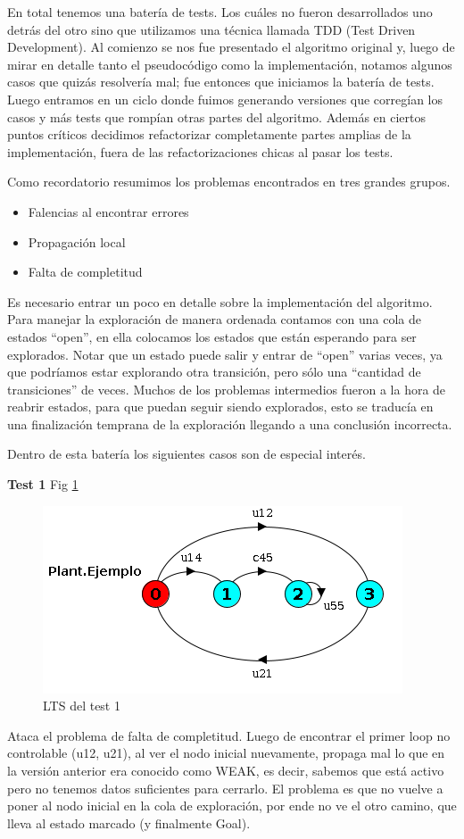En total tenemos una batería de \totalTests tests. Los cuáles no fueron desarrollados uno detrás del otro sino que utilizamos una técnica llamada TDD (Test Driven Development). Al comienzo se nos fue presentado el algoritmo original y, luego de mirar en detalle tanto el pseudocódigo como la implementación, notamos algunos casos que quizás resolvería mal; fue entonces que iniciamos la batería de tests. 
Luego entramos en un ciclo donde fuimos generando versiones que corregían los casos y más tests que rompían otras partes del algoritmo. Además en ciertos puntos críticos decidimos refactorizar completamente partes amplias de la implementación, fuera de las refactorizaciones chicas al pasar los tests.

Como recordatorio resumimos los problemas encontrados en tres grandes grupos.
\begin{itemize}
 \item Falencias al encontrar errores
 \item Propagación local
 \item Falta de completitud
\end{itemize}

Es necesario entrar un poco en detalle sobre la implementación del algoritmo. Para manejar la exploración de manera ordenada contamos con una cola de estados ``open'', en ella colocamos los estados que están esperando para ser explorados. Notar que un estado puede salir y entrar de ``open'' varias veces, ya que podríamos estar explorando otra transición, pero sólo una ``cantidad de transiciones'' de veces. Muchos de los problemas intermedios fueron a la hora de reabrir estados, para que puedan seguir siendo explorados, esto se traducía en una finalización temprana de la exploración llegando a una conclusión incorrecta.

Dentro de esta batería los siguientes casos son de especial interés.
\bigskip

\textbf{Test 1} Fig \ref{fig:test1}
\begin{figure}
 \centering
 \includegraphics[scale=0.7]{figures/tests/test1.png}
 \caption{LTS del test 1}
 \label{fig:test1}
\end{figure}
Ataca el problema de falta de completitud. Luego de encontrar el primer loop no controlable (u12, u21), al ver el nodo inicial nuevamente, propaga mal lo que en la versión anterior era conocido como WEAK, es decir, sabemos que está activo pero no tenemos datos suficientes para cerrarlo. El problema es que no vuelve a poner al nodo inicial en la cola de exploración, por ende no ve el otro camino, que lleva al estado marcado (y finalmente Goal).

